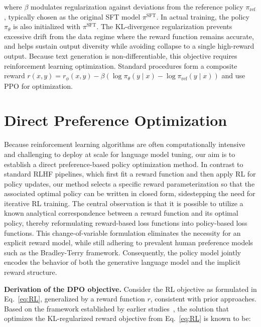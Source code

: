where $\beta$ modulates regularization against deviations from the reference policy $\pi_\text{ref}$, typically chosen as the original SFT model $\pi^\text{SFT}$. In actual training, the policy $\pi_\theta$ is also initialized with $\pi^\text{SFT}$. The KL-divergence regularization prevents excessive drift from the data regime where the reward function remains accurate, and helps sustain output diversity while avoiding collapse to a single high-reward output. Because text generation is non-differentiable, this objective requires reinforcement learning optimization. Standard procedures \citep{ziegler2020finetuning, stiennon2022learning, bai2022training, ouyang2022training} form a composite reward ${r(x, y) = r_{\phi}(x, y) -\beta (\log \pi_{\theta}(y\mid x) - \log \pi_\text{ref}(y\mid x))}$ and use PPO \cite{schulman2017proximal} for optimization.

\section{Direct Preference Optimization}\label{sec:DPO}

Because reinforcement learning algorithms are often computationally intensive and challenging to deploy at scale for language model tuning, our aim is to establish a direct preference-based policy optimization method. In contrast to standard RLHF pipelines, which first fit a reward function and then apply RL for policy updates, our method selects a specific reward parameterization so that the associated optimal policy can be written in closed form, sidestepping the need for iterative RL training. The central observation is that it is possible to utilize a known analytical correspondence between a reward function and its optimal policy, thereby reformulating reward-based loss functions into policy-based loss functions. This change-of-variable formulation eliminates the necessity for an explicit reward model, while still adhering to prevalent human preference models such as the Bradley-Terry framework. Consequently, the policy model jointly encodes the behavior of both the generative language model and the implicit reward structure.

\textbf{Derivation of the DPO objective.} Consider the RL objective as formulated in Eq.~\ref{eq:RL}, generalized by a reward function $r$, consistent with prior approaches. Based on the framework established by earlier studies~\citep{peters2007reinforcement, peng2019advantage, korbak2022reinforcement, go2023aligning}, the solution that optimizes the KL-regularized reward objective from Eq.~\ref{eq:RL} is known to be:

